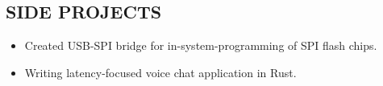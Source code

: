 \documentclass[letterpaper]{res}
\begin{document}
\begin{resume}


  \section{SIDE PROJECTS}
  \begin{itemize}
    \item Created USB-SPI bridge for in-system-programming of SPI flash chips.
    \item Writing latency-focused voice chat application in Rust.
  \end{itemize}


\end{resume}
\end{document}
